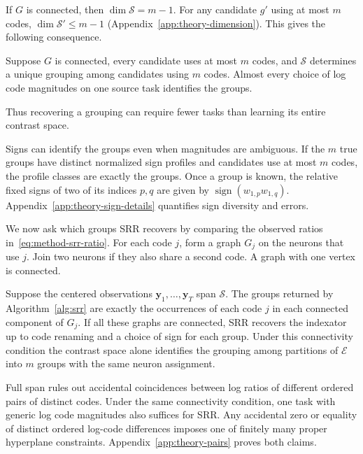 If $G$ is connected, then
$\dim\mathcal S=m-1$.
For any candidate $g'$ using at most $m$ codes,
$\dim\mathcal S'\le m-1$
(Appendix~\ref{app:theory-dimension}). This gives the following consequence.

\begin{corollary}
    \label{cor:theory-one-task}
    Suppose $G$ is connected, every candidate uses
    at most $m$ codes, and $\mathcal S$ determines a
    unique grouping among candidates using $m$ codes.
    Almost every choice of log code magnitudes on one source task
    identifies the groups.
\end{corollary}

Thus recovering a grouping can require fewer tasks than learning
its entire contrast space.

Signs can identify the groups even when magnitudes are ambiguous.
If the $m$ true groups have distinct normalized sign profiles and
candidates use at most $m$ codes, the profile classes are exactly
the groups. Once a group is known, the relative fixed signs of
two of its indices $p,q$ are given by
$\operatorname{sign}(w_{1,p}w_{1,q})$.
Appendix~\ref{app:theory-sign-details} quantifies sign diversity and errors.

We now ask which groups SRR recovers by comparing the observed
ratios in~\eqref{eq:method-srr-ratio}. For each code $j$, form a
graph $G_j$ on the neurons that use $j$. Join two
neurons if they also share a second code. A graph with one vertex
is connected.

\begin{theorem}
    \label{thm:theory-pair-recovery}
    Suppose the centered observations $\mathbf y_1,\ldots,\mathbf y_T$
    span $\mathcal S$. The groups returned by Algorithm~\ref{alg:srr} are
    exactly the occurrences of each code $j$ in each connected
    component of $G_j$. If all these graphs are connected,
    SRR recovers the indexator up to code renaming and a choice of
    sign for each group. Under this connectivity condition the
    contrast space alone identifies the grouping among partitions of
    $\mathcal E$ into $m$ groups with the same neuron assignment.
\end{theorem}

Full span rules out accidental coincidences between log ratios of
different ordered pairs of distinct codes. Under the same connectivity
condition, one task with generic log code magnitudes also suffices
for SRR. Any accidental zero or equality of distinct ordered
log-code differences imposes one of finitely many proper hyperplane
constraints. Appendix~\ref{app:theory-pairs} proves both claims.

